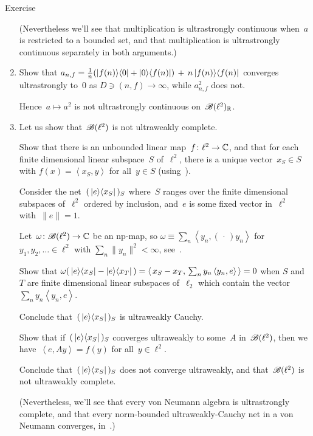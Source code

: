 \documentclass[a]{subfiles}
\begin{document}
\begin{parsec}
\begin{point}[vn-counterexamples]{Exercise}
\begin{enumerate}
(Nevertheless we'll see that multiplication is ultrastrongly continuous
when~$a$ is restricted to a bounded set,
and that multiplication is ultrastrongly continuous
separately in both arguments.)

\item
Show that
$a_{n,f} = \frac{1}{n}(\left|f(n)\right>\!\left<0\right|+\left|0\right>\!\left<f(n)\right|)
\,+\, n\left|f(n)\right>\!\left<f(n)\right|$
converges ultrastrongly to~$0$
as $D\ni(n,f)\to\infty$,
while $a_{n,f}^2$ does not.

Hence~$a\mapsto a^2$ is not ultrastrongly continuous on~$\mathscr{B}(\ell^2)_{\mathbb{R}}$.

\item
Let us show that~$\mathscr{B}(\ell^2)$
is not ultraweakly complete.

Show that there is an unbounded linear map~$f\colon \ell^2\to\mathbb{C}$,
and that for each finite dimensional linear subspace~$S$ of~$\ell^2$,
there is a unique vector~$x_S\in S$ 
with
$f(x)=\left<x_S,y\right>$ for all~$y\in S$
(using~).

Consider the net~$(\,\left|e\right>\!\left<x_S\right|\,)_S$
where~$S$ ranges over the finite dimensional subspaces of~$\ell^2$
ordered by inclusion,
and~$e$ is some fixed vector in~$\ell^2$ with~$\|e\|=1$.

Let~$\omega\colon \mathscr{B}(\ell^2)\to\mathbb{C}$
be an np-map,
so $\omega\equiv \sum_n \left<y_n,(\,\cdot\,)y_n\right>$
for $y_1,y_2,\dotsc \in \ell^2$ with $\sum_n \|y_n\|^2 <\infty$,
see~.

Show that $\omega(\,\left|e\right>\!\left<x_S\right|-\left|e\right>\!\left<x_T\right|\,)
= \left<\,x_S-x_T,\,\sum_n y_n\left<y_n,e\right>\,\right> = 0$
when $S$ and~$T$ are finite dimensional linear subspaces of~$\ell_2$
which contain the vector $\sum_n y_n\left<y_n,e\right>$.

Conclude that~$(\,\left|e\right>\!\left<x_S\right|\,)_S$
is ultraweakly Cauchy.

Show that if~$(\,\left|e\right>\!\left<x_S\right|\,)_S$
converges ultraweakly to some~$A$ in~$\mathscr{B}(\ell^2)$,
then we have~$\left<e,Ay\right>=f(y)$
for all~$y\in\ell^2$.

Conclude that~$(\,\left|e\right>\!\left<x_S\right|\,)_S$
does not converge ultraweakly,
and that~$\mathscr{B}(\ell^2)$ is not ultraweakly complete.

(Nevertheless, we'll see that every von Neumann algebra
is ultrastrongly complete, and that
every norm-bounded ultraweakly-Cauchy net
in a von Neumann converges, in~.)
\end{enumerate}
\end{point}
\end{parsec}
\end{document}
